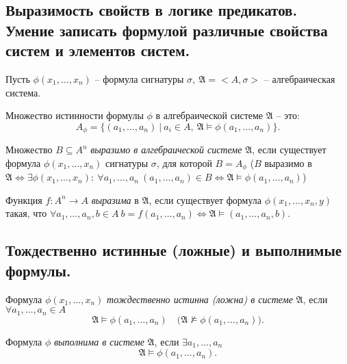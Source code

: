 \subsection{Выразимость свойств в логике предикатов. Умение записать формулой различные свойства систем и элементов систем.}

\begin{note}
    Пусть $ \phi(x_1,\ldots,x_n) $ -- формула сигнатуры $ \sigma, \ \mathfrak{A} = <A,\sigma> $ -- алгебраическая система.

    Множество истинности формулы $ \phi $ в алгебраической системе $ \mathfrak{A} $ -- это:
    \[
        A_\phi = \big\{(a_1,\ldots,a_n) \ \big| \ a_i \in A, \ \mathfrak{A} \vDash \phi(a_1,\ldots,a_n)\big\}.
    \]
\end{note}

\begin{definition}
    Множество $ B \subseteq A^n $ \emph{выразимо в алгебраической системе} $ \mathfrak{A} $, если существует формула $ \phi(x_1,\ldots,x_n) $ сигнатуры $ \sigma $, для которой $ B = A_\phi $ ($ B $ выразимо в $ \mathfrak{A} \iff \exists \phi(x_1,\ldots,x_n): \ \forall a_1,\ldots,a_n \ (a_1,\ldots,a_n) \in B \iff \mathfrak{A}\vDash \phi(a_1,\ldots,a_n) $)
\end{definition}

\begin{definition}
    Функция $ f: A^n \rightarrow A $ \emph{выразима} в $ \mathfrak{A} $, если существует формула $ \phi(x_1,\ldots,x_n,y) $ такая, что $ \forall a_1,\ldots,a_n,b \in A \ b = f(a_1,\ldots,a_n) \iff \mathfrak{A}\vDash (a_1,\ldots,a_n,b) $.
\end{definition}

\subsection{Тождественно истинные (ложные) и выполнимые формулы.}

\begin{definition}
    Формула $ \phi(x_1,\ldots,x_n) $ \emph{тождественно истинна (ложна) в системе} $ \mathfrak{A} $, если $ \forall a_1,\ldots,a_n \in A $
    \[
        \mathfrak{A} \vDash \phi(a_1,\ldots,a_n) \quad \big(\mathfrak{A}\nvDash \phi(a_1,\ldots,a_n)\big).
    \]

    Формула $ \phi $ \emph{выполнима в системе} $ \mathfrak{A} $, если $ \exists a_1,\ldots,a_n $
    \[
        \mathfrak{A} \vDash \phi(a_1,\ldots,a_n).
    \]
\end{definition}

